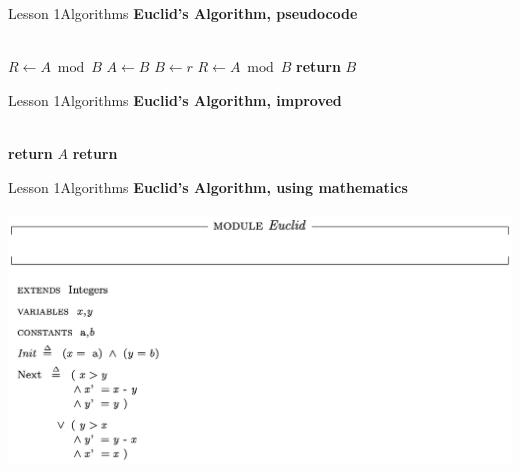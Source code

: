 \documentclass[aspectratio=1610]{beamer}
\begin{document}
\begin{frame}{Lesson 1}{Algorithms}
\Large
\textbf{Euclid's Algorithm, pseudocode}\\~\\

\label{GCD}
\begin{algorithmic}[1]
   \State $R\gets A\bmod B$
      \State $A\gets B$
      \State $B\gets r$
      \State $R\gets A\bmod B$
   \EndWhile\label{GCDendwhile}
   \State \textbf{return} $B$
\EndProcedure
\end{algorithmic}
\end{frame}



\begin{frame}{Lesson 1}{Algorithms}
\Large
\textbf{Euclid's Algorithm, improved}\\~\\

\label{Euclid}
\begin{algorithmic}[1]
    \State \textbf{return} $A$
\Else \State \textbf{return} 
\EndIf
\EndProcedure
\end{algorithmic}
\end{frame}






\begin{frame}{Lesson 1}{Algorithms}
\Large
\textbf{Euclid's Algorithm, using mathematics}\\~\\
\includegraphics[scale=0.5]{Images/gcdtla}
\end{frame}
\end{document}
